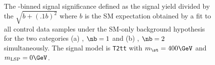 \begin{figure}[t!]
  \begin{center}
     \\
    \caption{\label{fig:t2cc-best-fit} The \scalht-binned 
      signal significance defined as the signal yield 
      divided by the $\sqrt{b+(.1b)^2}$ where $b$ is the
      SM expectation obtained by a fit to all 
      control data samples under the SM-only background 
      hypothesis for the two categories (a) \njethigh, $\nb = 1$ and (b) 
      \njethigh, $\nb = 2$ simultaneously. 
      The signal model is \texttt{T2tt} with 
      $m_{\st} = 400\GeV$ and $m_{\text{LSP}} = 0\GeV$.} 
  \end{center}
\end{figure}

